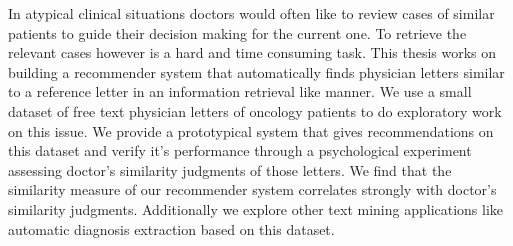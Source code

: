 \documentclass[Thesis.tex]{subfiles}
\begin{document}
\setlength{\parindent}{0cm}
In atypical clinical situations doctors would often like to review cases of similar patients to guide their decision making for the current one. To retrieve the relevant cases however is a hard and time consuming task. This thesis works on building a recommender system that automatically finds physician letters similar to a reference letter in an information retrieval like manner. We use a small dataset of free text physician letters of oncology patients to do exploratory work on this issue. We provide a prototypical system that gives recommendations on this dataset and verify it's performance through a psychological experiment assessing doctor's similarity judgments of those letters. We find that the similarity measure of our recommender system correlates strongly with doctor's similarity judgments. Additionally we explore other text mining applications like automatic diagnosis extraction based on this dataset.
\end{document}
